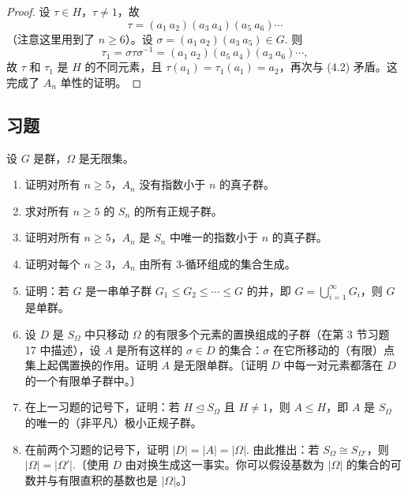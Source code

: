 \begin{proof}
设 \(\tau \in H\)，\(\tau \neq 1\)，故
\[
\tau = (a_1\ a_2)(a_3\ a_4)(a_5\ a_6)\cdots
\]
（注意这里用到了 \(n \geq 6\)）。设 \(\sigma = (a_1\ a_2)(a_3\ a_5) \in G\). 则
\[
\tau_1 = \sigma\tau\sigma^{-1} = (a_1\ a_2)(a_5\ a_4)(a_3\ a_6)\cdots,
\]
故 \(\tau\) 和 \(\tau_1\) 是 \(H\) 的不同元素，且 \(\tau(a_1) = \tau_1(a_1) = a_2\)，再次与 (4.2) 矛盾。这完成了 \(A_n\) 单性的证明。
\end{proof}

\subsection*{习题}
设 \(G\) 是群，\(\Omega\) 是无限集。

\begin{enumerate}
\item 证明对所有 \(n \geq 5\)，\(A_n\) 没有指数小于 \(n\) 的真子群。

\item 求对所有 \(n \geq 5\) 的 \(S_n\) 的所有正规子群。

\item 证明对所有 \(n \geq 5\)，\(A_n\) 是 \(S_n\) 中唯一的指数小于 \(n\) 的真子群。

\item 证明对每个 \(n \geq 3\)，\(A_n\) 由所有 3-循环组成的集合生成。

\item 证明：若 \(G\) 是一串单子群 \(G_1 \leq G_2 \leq \cdots \leq G\) 的并，即 \(G = \bigcup_{i=1}^{\infty} G_i\)，则 \(G\) 是单群。

\item 设 \(D\) 是 \(S_\Omega\) 中只移动 \(\Omega\) 的有限多个元素的置换组成的子群（在第 3 节习题 17 中描述），设 \(A\) 是所有这样的 \(\sigma \in D\) 的集合：\(\sigma\) 在它所移动的（有限）点集上起偶置换的作用。证明 \(A\) 是无限单群。〔证明 \(D\) 中每一对元素都落在 \(D\) 的一个有限单子群中。〕

\item 在上一习题的记号下，证明：若 \(H \trianglelefteq S_\Omega\) 且 \(H \neq 1\)，则 \(A \leq H\)，即 \(A\) 是 \(S_\Omega\) 的唯一的（非平凡）极小正规子群。

\item 在前两个习题的记号下，证明 \(|D| = |A| = |\Omega|\). 由此推出：若 \(S_\Omega \cong S_{\Omega'}\)，则 \(|\Omega| = |\Omega'|\).〔使用 \(D\) 由对换生成这一事实。你可以假设基数为 \(|\Omega|\) 的集合的可数并与有限直积的基数也是 \(|\Omega|\)。〕
\end{enumerate}

